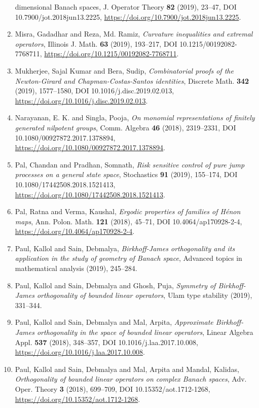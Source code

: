 \begin{enumerate}
{dimensional {B}anach spaces}, J. Operator Theory {\bf 82} (2019), 23--47, DOI 10.7900/jot.2018jun13.2225, \url{https://doi.org/10.7900/jot.2018jun13.2225}.
\item Misra, Gadadhar and Reza, Md. Ramiz, {\em Curvature inequalities and extremal operators}, Illinois J. Math. {\bf 63} (2019), 193--217, DOI 10.1215/00192082-7768711, \url{https://doi.org/10.1215/00192082-7768711}.
\item Mukherjee, Sajal Kumar and Bera, Sudip, {\em Combinatorial proofs of the {N}ewton-{G}irard and
{C}hapman-{C}ostas-{S}antos identities}, Discrete Math. {\bf 342} (2019), 1577--1580, DOI 10.1016/j.disc.2019.02.013, \url{https://doi.org/10.1016/j.disc.2019.02.013}.
\item Narayanan, E. K. and Singla, Pooja, {\em On monomial representations of finitely generated nilpotent
groups}, Comm. Algebra {\bf 46} (2018), 2319--2331, DOI 10.1080/00927872.2017.1378894, \url{https://doi.org/10.1080/00927872.2017.1378894}.
\item Pal, Chandan and Pradhan, Somnath, {\em Risk sensitive control of pure jump processes on a general
state space}, Stochastics {\bf 91} (2019), 155--174, DOI 10.1080/17442508.2018.1521413, \url{https://doi.org/10.1080/17442508.2018.1521413}.
\item Pal, Ratna and Verma, Kaushal, {\em Ergodic properties of families of {H}\'{e}non maps}, Ann. Polon. Math. {\bf 121} (2018), 45--71, DOI 10.4064/ap170928-2-4, \url{https://doi.org/10.4064/ap170928-2-4}.
\item Paul, Kallol and Sain, Debmalya, {\em Birkhoff-{J}ames orthogonality and its application in the
study of geometry of {B}anach space}, Advanced topics in mathematical analysis {\bf } (2019), 245--284.
\item Paul, Kallol and Sain, Debmalya and Ghosh, Puja, {\em Symmetry of {B}irkhoff-{J}ames orthogonality of bounded linear
operators}, Ulam type stability {\bf } (2019), 331--344.
\item Paul, Kallol and Sain, Debmalya and Mal, Arpita, {\em Approximate {B}irkhoff-{J}ames orthogonality in the space of
bounded linear operators}, Linear Algebra Appl. {\bf 537} (2018), 348--357, DOI 10.1016/j.laa.2017.10.008, \url{https://doi.org/10.1016/j.laa.2017.10.008}.
\item Paul, Kallol and Sain, Debmalya and Mal, Arpita and Mandal,
Kalidas, {\em Orthogonality of bounded linear operators on complex {B}anach
spaces}, Adv. Oper. Theory {\bf 3} (2018), 699--709, DOI 10.15352/aot.1712-1268, \url{https://doi.org/10.15352/aot.1712-1268}.

\end{enumerate}
